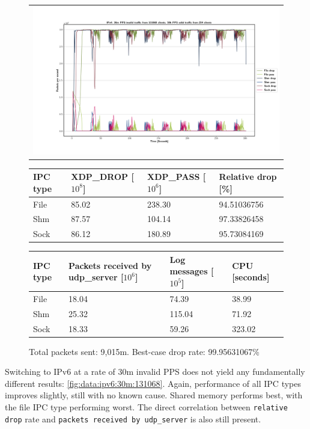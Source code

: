 \begin{figure}[!h]
	\centering
	\scriptsize
	\begin{tabular}{c}
    	\centerline{\includegraphics[width=1.2\textwidth]{images/IPv4_30m_131068_2.png}}
	\end{tabular}
	\begin{tabular}{llll}
		\toprule
		\textbf{IPC type} & \textbf{XDP\_DROP [$10^8$]} & \textbf{XDP\_PASS [$10^6$]} & \textbf{Relative drop [\%]} \\ \midrule 
		File & 85.02 & 238.30 & 94.51036756 \\
        Shm & 87.57 & 104.14 & 97.33826458 \\
        Sock & 86.12 & 180.89 & 95.73084169 \\
	\bottomrule
	\end{tabular}
    \begin{tabular}{llll}
		\toprule
		\textbf{IPC type} & \textbf{Packets received by udp\_server [$10^6$]} & \textbf{Log messages [$10^5$]} & \textbf{CPU [seconds]} \\ \midrule 
		File & 18.04 & 74.39 & 38.99 \\
        Shm & 25.32 & 115.04 & 71.92 \\
        Sock & 18.33 & 59.26 & 323.02 \\
	\bottomrule
	\end{tabular}
	\caption[Simplefail2ban, IPv4, 30m \ac{PPS}, 131,068 malicious clients]{Total packets sent: 9,015m. Best-case drop rate: 99.95631067\%}
	\label{fig:data:ipv4:30m:131068}
\end{figure}

Switching to IPv6 at a rate of 30m invalid \ac{PPS} does not yield any fundamentally different results: \ref{fig:data:ipv6:30m:131068}.
Again, performance of all \ac{IPC} types improves slightly, still with no known cause.
Shared memory performs best, with the file \ac{IPC} type performing worst.
The direct correlation between \texttt{relative drop} rate and \texttt{packets received by udp\_server} is also still present.

